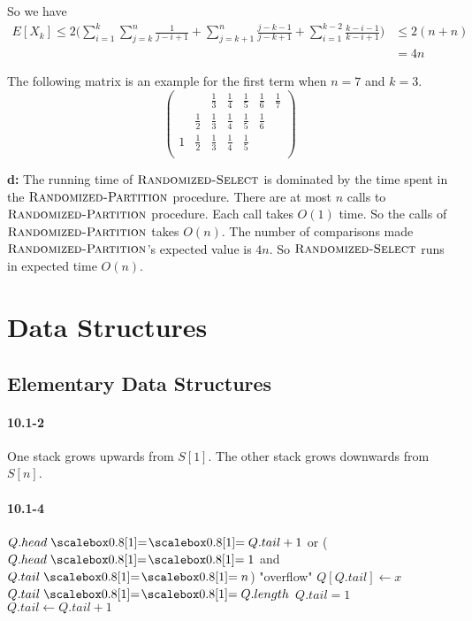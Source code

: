 \documentclass{book}
\begin{document}
\begin{CJK}{UTF8}{gkai}
So we have
\begin{align*}
E[X_k] \le 2\Bigg(\sum_{i=1}^{k}\sum_{j=k}^{n}\frac{1}{j-i+1} + 
\sum_{j=k+1}^{n}\frac{j-k-1}{j-k+1} + \sum_{i=1}^{k-2}\frac{k-i-1}{k-i+1} \Bigg) 
& \le 2(n+n) \\
& = 4n
\end{align*}

The following matrix is an example for the first term when $n=7$ and $k=3$.
\begin{equation*}
\left(
\begin{array}{ccccccc}
 & &  \frac{1}{3} & \frac{1}{4} & \frac{1}{5} & \frac{1}{6} & \frac{1}{7} \\
 & \frac{1}{2} & \frac{1}{3} & \frac{1}{4} & \frac{1}{5} & \frac{1}{6} \\
1 & \frac{1}{2} & \frac{1}{3} & \frac{1}{4} & \frac{1}{5} \\
\end{array} \right)
\end{equation*}


\textbf{d:} The running time of $\textnormal{\scshape Randomized-Select}$ is dominated by the 
time spent in the $\textnormal{\scshape Randomized-Partition}$ procedure. There are at most $n$ 
calls to $\textnormal{\scshape Randomized-Partition}$ procedure. Each call takes $O(1)$ time.  
So the calls of $\textnormal{\scshape Randomized-Partition}$ takes $O(n)$. The number of 
comparisons made $\textnormal{\scshape Randomized-Partition}$'s expected value is $4n$. So 
$\textnormal{\scshape Randomized-Select}$ runs in expected time $O(n)$.

\part{Data Structures}

\chapter{Elementary Data Structures}

\subsection*{10.1-2} One stack grows upwards from $S[1]$. The other stack grows 
downwards from $S[n]$.

\subsection*{10.1-4}
\begin{codebox}
\li \If $Q.head \isequal Q.tail+1$ or ($Q.head \isequal 1$ and $Q.tail \isequal 
n$)
\li \Then \Error "overflow"
\li \Else $Q[Q.tail] \gets x$
\li \If $Q.tail \isequal Q.length$
\li \Then $Q.tail = 1$
\li \Else $Q.tail \gets Q.tail + 1$
\End
\end{codebox}


\end{CJK}
\end{document}
